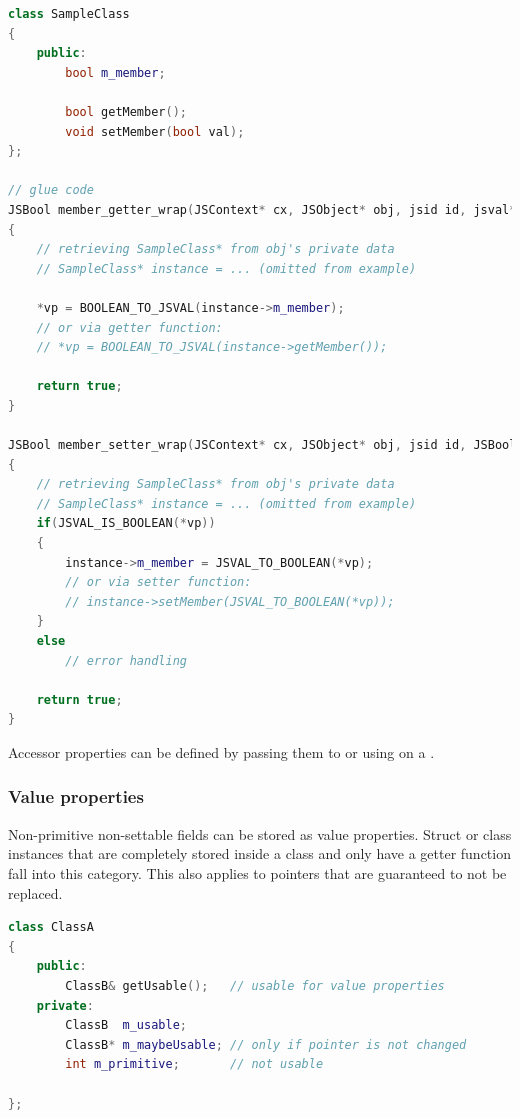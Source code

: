 \SingleSpacing
\begin{lstlisting}[language=C++, caption=Glue code for accessor properties]
class SampleClass
{
	public:
		bool m_member;
		
		bool getMember();
		void setMember(bool val);
};

// glue code
JSBool member_getter_wrap(JSContext* cx, JSObject* obj, jsid id, jsval* vp)
{
	// retrieving SampleClass* from obj's private data
	// SampleClass* instance = ... (omitted from example)
	
	*vp = BOOLEAN_TO_JSVAL(instance->m_member);
	// or via getter function: 		
	// *vp = BOOLEAN_TO_JSVAL(instance->getMember());

	return true;
}

JSBool member_setter_wrap(JSContext* cx, JSObject* obj, jsid id, JSBool strict, jsval* vp)
{
	// retrieving SampleClass* from obj's private data
	// SampleClass* instance = ... (omitted from example)
	if(JSVAL_IS_BOOLEAN(*vp))
	{
		instance->m_member = JSVAL_TO_BOOLEAN(*vp);
		// or via setter function: 		
		// instance->setMember(JSVAL_TO_BOOLEAN(*vp));
	}
	else
		// error handling

	return true;
}
\end{lstlisting}
\OnehalfSpacing

Accessor properties can be defined by passing them to  or using \linebreak{} on a .

\subsubsection{Value properties}
\label{sec:ValueProperties}

Non-primitive non-settable fields can be stored as value properties. Struct or class instances that are completely stored inside a class and only have a getter function fall into this category. This also applies to pointers that are guaranteed to not be replaced.

\SingleSpacing
\begin{lstlisting}[language=C++, caption=Fields usable for value properties]
class ClassA
{
	public:
		ClassB& getUsable();   // usable for value properties
	private:
		ClassB  m_usable;  
		ClassB* m_maybeUsable; // only if pointer is not changed
		int m_primitive;       // not usable

};
\end{lstlisting}
\OnehalfSpacing

